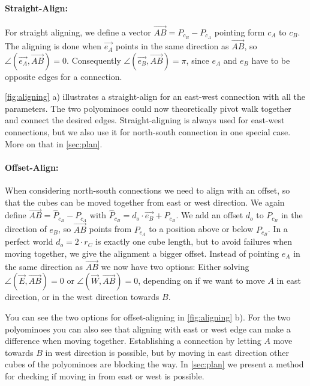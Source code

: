 \paragraph{Straight-Align:}

For straight aligning, we define a vector $\overrightarrow{AB} = P_{c_B} - P_{c_A}$ pointing form $c_A$ to $c_B$.
The aligning is done when $\vec{e_A}$ points in the same direction as $\overrightarrow{AB}$, so $\angle \left( \vec{e_A}, \overrightarrow{AB} \right) = 0$.
Consequently $\angle \left( \vec{e_B}, \overrightarrow{AB} \right) = \pi$, since $e_A$ and $e_B$ have to be opposite edges for a connection.

\autoref{fig:aligning} a) illustrates a straight-align for an east-west connection with all the parameters.
The two polyominoes could now theoretically pivot walk together and connect the desired edges.
Straight-aligning is always used for east-west connections, but we also use it for north-south connection in one special case. More on that in \autoref{sec:plan}.

\paragraph{Offset-Align:}

When considering north-south connections we need to align with an offset, so that the cubes can be moved together from east or west direction.
We again define $\overrightarrow{AB} = \hat{P}_{c_B} - P_{c_A}$ with $\hat{P}_{c_B} = d_o \cdot \vec{e_B} + P_{c_B}$.
We add an offset $d_o$ to $P_{c_B}$ in the direction of $e_B$, so $\overrightarrow{AB}$ points from $P_{c_A}$ to a position above or below $P_{c_B}$.
In a perfect world $d_o = 2 \cdot r_C$ is exactly one cube length, but to avoid failures when moving together, we give the alignment a bigger offset.
Instead of pointing $e_A$ in the same direction as $\overrightarrow{AB}$ we now have two options:
Either solving $\angle \left( \vec{E}, \overrightarrow{AB} \right) = 0$ or $\angle \left( \vec{W}, \overrightarrow{AB} \right) = 0$, depending on if we want to move $A$ in east direction, or in the west direction towards $B$.

You can see the two options for offset-aligning in \autoref{fig:aligning} b).
For the two polyominoes you can also see that aligning with east or west edge can make a difference when moving together.
Establishing a connection by letting $A$ move towards $B$ in west direction is possible, but by moving in east direction other cubes of the polyominoes are blocking the way.
In \autoref{sec:plan} we present a method for checking if moving in from east or west is possible. 


